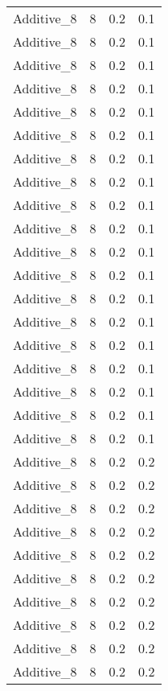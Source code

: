 \documentclass{article}
\begin{document}
\begin{longtable}[H]{lrrr}
 Additive\_8 &       8 &   0.2 &            0.1 \\
 Additive\_8 &       8 &   0.2 &            0.1 \\
 Additive\_8 &       8 &   0.2 &            0.1 \\
 Additive\_8 &       8 &   0.2 &            0.1 \\
 Additive\_8 &       8 &   0.2 &            0.1 \\
 Additive\_8 &       8 &   0.2 &            0.1 \\
 Additive\_8 &       8 &   0.2 &            0.1 \\
 Additive\_8 &       8 &   0.2 &            0.1 \\
 Additive\_8 &       8 &   0.2 &            0.1 \\
 Additive\_8 &       8 &   0.2 &            0.1 \\
 Additive\_8 &       8 &   0.2 &            0.1 \\
 Additive\_8 &       8 &   0.2 &            0.1 \\
 Additive\_8 &       8 &   0.2 &            0.1 \\
 Additive\_8 &       8 &   0.2 &            0.1 \\
 Additive\_8 &       8 &   0.2 &            0.1 \\
 Additive\_8 &       8 &   0.2 &            0.1 \\
 Additive\_8 &       8 &   0.2 &            0.1 \\
 Additive\_8 &       8 &   0.2 &            0.1 \\
 Additive\_8 &       8 &   0.2 &            0.1 \\
 Additive\_8 &       8 &   0.2 &            0.2 \\
 Additive\_8 &       8 &   0.2 &            0.2 \\
 Additive\_8 &       8 &   0.2 &            0.2 \\
 Additive\_8 &       8 &   0.2 &            0.2 \\
 Additive\_8 &       8 &   0.2 &            0.2 \\
 Additive\_8 &       8 &   0.2 &            0.2 \\
 Additive\_8 &       8 &   0.2 &            0.2 \\
 Additive\_8 &       8 &   0.2 &            0.2 \\
 Additive\_8 &       8 &   0.2 &            0.2 \\
 Additive\_8 &       8 &   0.2 &            0.2 \\

\end{longtable}
\end{document}
